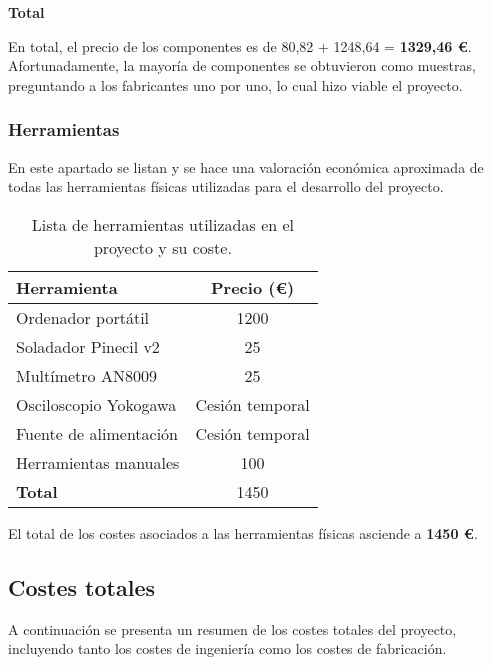 \textbf{Total}

En total, el precio de los componentes es de 80,82 + 1248,64 = \textbf{1329,46 \euro{}}. Afortunadamente, la mayoría de componentes se obtuvieron como muestras, preguntando a los fabricantes uno por uno, lo cual hizo viable el proyecto.

\subsubsection{Herramientas}

En este apartado se listan y se hace una valoración económica aproximada de todas las herramientas físicas utilizadas para el desarrollo del proyecto.

\begin{table}[ht]
	\centering
	\begin{tabular}{|l|c|}
		\hline
		\textbf{Herramienta} & \textbf{Precio (\euro{})} \\
		\hline
		Ordenador portátil & 1200 \\
		Soladador Pinecil v2 & 25 \\
		Multímetro AN8009 & 25 \\
		Osciloscopio Yokogawa & Cesión temporal \\
		Fuente de alimentación & Cesión temporal \\
		Herramientas manuales & 100 \\
		\hline
		\textbf{Total} & 1450 \\
		\hline
	\end{tabular}
	\caption{Lista de herramientas utilizadas en el proyecto y su coste.}
\end{table}

El total de los costes asociados a las herramientas físicas asciende a \textbf{1450 \euro}.

\subsection{Costes totales}

A continuación se presenta un resumen de los costes totales del proyecto, incluyendo tanto los costes de ingeniería como los costes de fabricación.

